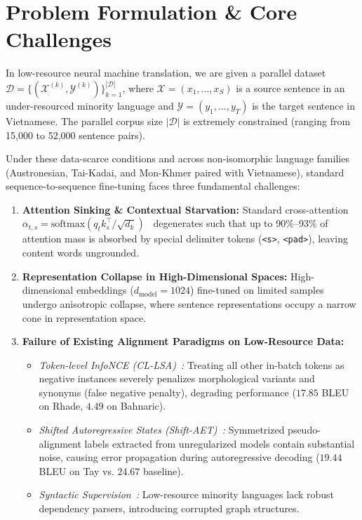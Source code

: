 \documentclass[11pt,a4paper]{article}
\begin{document}
\newpage
\tableofcontents
\newpage

\section{Problem Formulation \& Core Challenges}
\label{sec:problem_formulation}

In low-resource neural machine translation, we are given a parallel dataset $\mathcal{D} = \{(\mathcal{X}^{(k)}, \mathcal{Y}^{(k)})\}_{k=1}^{|\mathcal{D}|}$, where $\mathcal{X} = (x_1, \dots, x_S)$ is a source sentence in an under-resourced minority language and $\mathcal{Y} = (y_1, \dots, y_T)$ is the target sentence in Vietnamese. The parallel corpus size $|\mathcal{D}|$ is extremely constrained (ranging from 15,000 to 52,000 sentence pairs).

Under these data-scarce conditions and across non-isomorphic language families (Austronesian, Tai-Kadai, and Mon-Khmer paired with Vietnamese), standard sequence-to-sequence fine-tuning faces three fundamental challenges:

\begin{enumerate}[leftmargin=*]
    \item \textbf{Attention Sinking \& Contextual Starvation:} Standard cross-attention $\alpha_{t, s} = \text{softmax}(q_t k_s^\top / \sqrt{d_k})$~\cite{vaswani2017attention,bahdanau2015neural} degenerates such that up to 90\%--93\% of attention mass is absorbed by special delimiter tokens (\texttt{<s>}, \texttt{<pad>}), leaving content words ungrounded.
    \item \textbf{Representation Collapse in High-Dimensional Spaces:} High-dimensional embeddings ($d_{\text{model}} = 1024$) fine-tuned on limited samples undergo anisotropic collapse, where sentence representations occupy a narrow cone in representation space.
    \item \textbf{Failure of Existing Alignment Paradigms on Low-Resource Data:}
    \begin{itemize}
        \item \textit{Token-level InfoNCE (CL-LSA)~\cite{chi2021infoxlm}:} Treating all other in-batch tokens as negative instances severely penalizes morphological variants and synonyms (false negative penalty), degrading performance ($17.85$ BLEU on Rhade, $4.49$ on Bahnaric).
        \item \textit{Shifted Autoregressive States (Shift-AET)~\cite{chen2020accurate}:} Symmetrized pseudo-alignment labels extracted from unregularized models contain substantial noise, causing error propagation during autoregressive decoding ($19.44$ BLEU on Tay vs. $24.67$ baseline).
        \item \textit{Syntactic Supervision~\cite{li2022structural}:} Low-resource minority languages lack robust dependency parsers, introducing corrupted graph structures.
    \end{itemize}
\end{enumerate}
\end{document}
